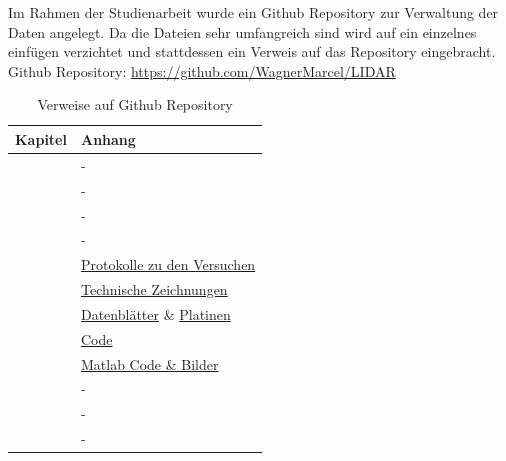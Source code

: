 \newpage
{}
Im Rahmen der Studienarbeit wurde ein Github Repository zur Verwaltung der Daten angelegt. Da die Dateien sehr umfangreich sind wird auf ein einzelnes einfügen verzichtet und stattdessen ein Verweis auf das Repository eingebracht.\\
Github Repository: \href{https://github.com/WagnerMarcel/LIDAR}{https://github.com/WagnerMarcel/LIDAR}
\begin{table}[H]
	\centering
	\caption{Verweise auf Github Repository}
	\begin{tabular}{|l|l|}
		\hline
		\textbf{Kapitel} & \textbf{Anhang} \\\hline
		\fullref{chap:einleitung} & - \\\hline
		\fullref{chap:grundlagen_et} & - \\\hline
		\fullref{chap:grund_lidar} & - \\\hline
		\fullref{chap:stand_der_technik} & -\\\hline
		\fullref{chap:machbarkeitsstudie} & \href{https://github.com/WagnerMarcel/LIDAR/tree/master/04_Protokolle}{Protokolle zu den Versuchen} \\\hline
		\fullref{chap:mechanik} & \href{https://github.com/WagnerMarcel/LIDAR/tree/master/08_Mechanik}{Technische Zeichnungen} \\\hline
		\fullref{chap:hardware} & \href{https://github.com/WagnerMarcel/LIDAR/tree/master/05_Datenblätter/VL53L1X}{Datenblätter} \& \href{https://github.com/WagnerMarcel/LIDAR/tree/master/09_Platinen}{Platinen}\\\hline
		\fullref{chap:code} & \href{https://github.com/WagnerMarcel/LIDAR/tree/master/07_Code}{Code} \\\hline
		\fullref{chap:auswertung_matlab} & \href{https://github.com/WagnerMarcel/LIDAR/tree/master/11_Auswertung}{Matlab Code \& Bilder} \\\hline
		\fullref{chap:validierung} & - \\\hline
		\fullref{chap:fazit} & - \\\hline
		\fullref{chap:ausblick} & - \\\hline
	\end{tabular}
\end{table}

\newpage
{}

